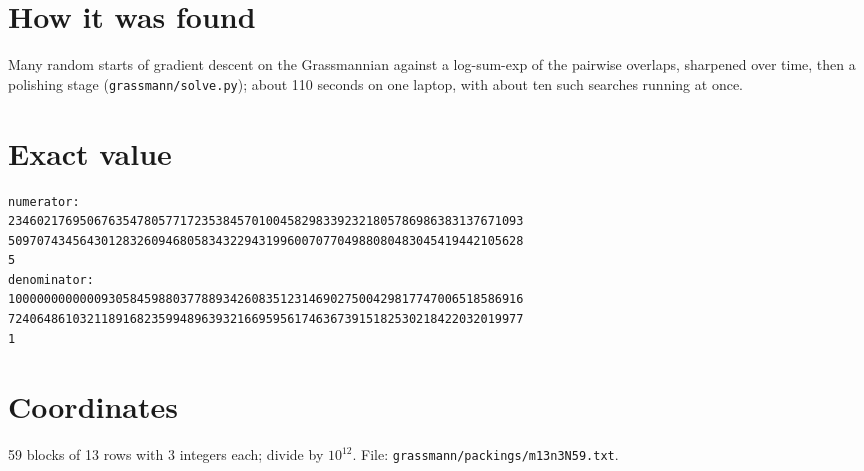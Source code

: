 \documentclass[11pt,a4paper]{article}
\begin{document}
\section{How it was found}
Many random starts of gradient descent on the Grassmannian against a log-sum-exp of the pairwise overlaps, sharpened over time, then a polishing stage (\texttt{grassmann/solve.py}); about 110 seconds on one laptop, with about ten such searches running at once.


\appendix
\section{Exact value}
{\small
\begin{verbatim}
numerator:
234602176950676354780577172353845701004582983392321805786986383137671093
509707434564301283260946805834322943199600707704988080483045419442105628
5
denominator:
100000000000093058459880377889342608351231469027500429817747006518586916
724064861032118916823599489639321669595617463673915182530218422032019977
1
\end{verbatim}}

\section{Coordinates}
59 blocks of 13 rows with 3 integers each; divide by $10^{12}$. File: \texttt{grassmann/packings/m13n3N59.txt}.
{\tiny
\begin{multicols}{3}
\end{multicols}}
\end{document}
